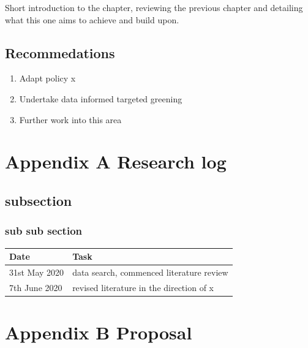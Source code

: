 \documentclass[
  12pt,
  oneside]{book}
\providecommand{\tightlist}{%
  \setlength{\itemsep}{0pt}\setlength{\parskip}{0pt}}
\begin{document}
Short introduction to the chapter, reviewing the previous chapter and detailing what this one aims to achieve and build upon.

\hypertarget{recommedations}{%
\section{Recommedations}\label{recommedations}}

\begin{enumerate}
\def\labelenumi{\arabic{enumi}.}
\tightlist
\item
  Adapt policy x
\item
  Undertake data informed targeted greening
\item
  Further work into this area
\end{enumerate}

\printbibliography

\hypertarget{appendix-a-research-log}{%
\chapter*{Appendix A Research log}\label{appendix-a-research-log}}


\hypertarget{subsection}{%
\section*{subsection}\label{subsection}}

\hypertarget{sub-sub-section}{%
\subsection*{sub sub section}\label{sub-sub-section}}

\begin{table}[H]
\centering
\begin{tabular}{ll}
\toprule
\textbf{Date} & \textbf{Task}\\
\midrule
31st May 2020 & data search, commenced literature review\\
7th June 2020 & revised literature in the direction of x\\
\bottomrule
\end{tabular}
\end{table}

\hypertarget{appendix-b-proposal}{%
\chapter*{Appendix B Proposal}\label{appendix-b-proposal}}

\enddocument

\printbibliography
\end{document}
